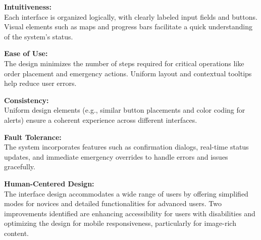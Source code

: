 \documentclass{article}
\begin{document}
\textbf{Intuitiveness:} \\
Each interface is organized logically, with clearly labeled input fields and buttons. Visual elements such as maps and progress bars facilitate a quick understanding of the system’s status.

\bigskip
\textbf{Ease of Use:} \\
The design minimizes the number of steps required for critical operations like order placement and emergency actions. Uniform layout and contextual tooltips help reduce user errors.

\bigskip
\textbf{Consistency:} \\
Uniform design elements (e.g., similar button placements and color coding for alerts) ensure a coherent experience across different interfaces.

\bigskip
\textbf{Fault Tolerance:} \\
The system incorporates features such as confirmation dialogs, real-time status updates, and immediate emergency overrides to handle errors and issues gracefully.

\bigskip
\textbf{Human-Centered Design:} \\
The interface design accommodates a wide range of users by offering simplified modes for novices and detailed functionalities for advanced users. Two improvements identified are enhancing accessibility for users with disabilities and optimizing the design for mobile responsiveness, particularly for image-rich content.
\end{document}
